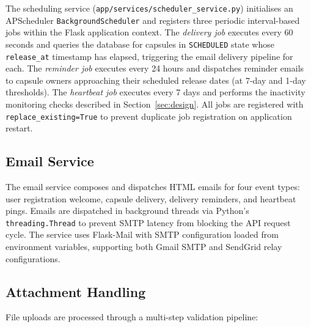 \documentclass[12pt, a4paper]{article}
\begin{document}
The scheduling service (\texttt{app/services/scheduler\_service.py}) initialises an APScheduler \texttt{BackgroundScheduler} and registers three periodic interval-based jobs within the Flask application context. The \textit{delivery job} executes every 60 seconds and queries the database for capsules in \texttt{SCHEDULED} state whose \texttt{release\_at} timestamp has elapsed, triggering the email delivery pipeline for each. The \textit{reminder job} executes every 24 hours and dispatches reminder emails to capsule owners approaching their scheduled release dates (at 7-day and 1-day thresholds). The \textit{heartbeat job} executes every 7 days and performs the inactivity monitoring checks described in Section~\ref{sec:design}. All jobs are registered with \texttt{replace\_existing=True} to prevent duplicate job registration on application restart.

\subsection{Email Service}

The email service composes and dispatches HTML emails for four event types: user registration welcome, capsule delivery, delivery reminders, and heartbeat pings. Emails are dispatched in background threads via Python's \texttt{threading.Thread} to prevent SMTP latency from blocking the API request cycle. The service uses Flask-Mail with SMTP configuration loaded from environment variables, supporting both Gmail SMTP and SendGrid relay configurations.

\subsection{Attachment Handling}

File uploads are processed through a multi-step validation pipeline:
\end{document}
